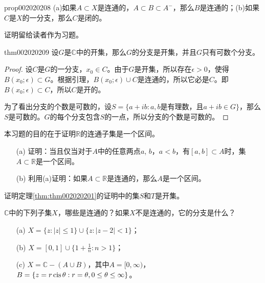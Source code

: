 \begin{proposition}{}{prop002020208}
(a)如果$A \subset X$是连通的，$A \subset B \subset A^-$，那么$B$是连通的；(b)如果$C$是$X$的一分支，那么$C$是闭的。
\end{proposition}

证明留给读者作为习题。

\begin{theorem}{}{thm002020209}
设$G$是$\mathbb{C}$中的开集，那么$G$的分支是开集，并且$G$只有可数个分支。 
\end{theorem}

\begin{proof}
设$C$是$G$的一分支，$x_0 \in C$。由于$G$是开集，所以存在$\epsilon > 0$，使得$B(x_0;\epsilon) \subset G$。根据引理，$B(x_0;\epsilon) \cup C$是连通的，所以它必是$C$。即$B(x_0;\epsilon) \subset C$，所以$C$是开的。

为了看出分支的个数是可数的，设$S = \{a + ib: a, b\text{是有理数，且}a+ib \in G\}$，那么$S$是可数的。$G$的每个分支包含$S$的一点，所以分支的个数是可数的。
\end{proof}

\begin{exercise}\label{exer002020201}
本习题的目的在于证明$\mathbb{R}$的连通子集是一个区间。
\begin{enumerate}
\item[(a)]证明：当且仅当对于$A$中的任意两点$a$, $b$，$a < b$，有$[a, b] \subset A$时，集$A \subset \mathbb{R}$是一个区间。
\item[(b)]利用(a)证明：如果$A \subset \mathbb{R}$是连通的，那么$A$是一个区间。
\end{enumerate}
\end{exercise}

\begin{exercise}\label{exer002020202}
证明定理\ref{thm:thm002020201}的证明中的集$S$和$T$是开集。
\end{exercise}

\begin{exercise}
$\mathbb{C}$中的下列子集$X$，哪些是连通的？如果$X$不是连通的，它的分支是什么？
\begin{enumerate}
\item[(a)]$X = \{z: |z| \le 1\} \cup \{z:|z-2| < 1\}$；
\item[(b)]$X = [0, 1] \cup \{1 + \frac{1}{n}: n > 1\}$；
\item[(c)]$X = \mathbb{C} - (A \cup B)$，其中$A = [0, \infty)$，$B = \{z = r\,\text{cis}\,{\theta} : r = \theta, 0 \le \theta \le \infty \}$。
\end{enumerate}
\end{exercise}

